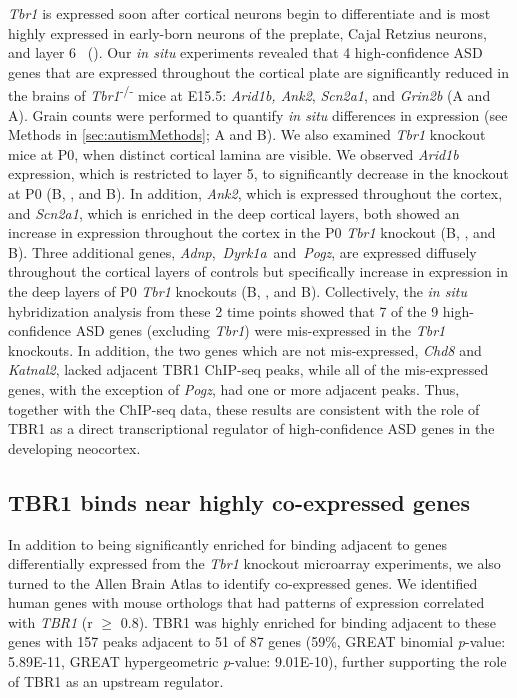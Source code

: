\emph{Tbr1} is expressed soon after cortical neurons begin to
differentiate and is most highly expressed in early-born neurons of the
preplate, Cajal Retzius neurons, and layer 6~\citep{Bulfone:1995kl} (). Our \emph{in situ} experiments revealed that 4 high-confidence ASD
genes that are expressed throughout the cortical plate are significantly
reduced in the brains of \emph{Tbr1}\textsuperscript{-/-} mice at E15.5:
\emph{Arid1b, Ank2}, \emph{Scn2a1}, and \emph{Grin2b} (A and
A). Grain counts were performed to quantify \emph{in
situ} differences in expression (see Methods in \ref{sec:autismMethods}; A and B). We also
examined \emph{Tbr1} knockout mice at P0, when distinct cortical lamina
are visible. We observed \emph{Arid1b} expression, which is restricted
to layer 5, to significantly decrease in the knockout at P0 (B,
, and B). In addition, \emph{Ank2}, which is
expressed throughout the cortex, and \emph{Scn2a1}, which is enriched in
the deep cortical layers, both showed an increase in expression
throughout the cortex in the P0 \emph{Tbr1} knockout (B,
, and B). Three additional genes,
\emph{Adnp},~\emph{Dyrk1a}~and~\emph{Pogz}, are expressed diffusely
throughout the cortical layers of controls but specifically increase in
expression in the deep layers of P0 \emph{Tbr1} knockouts (B, , and B). Collectively, the \emph{in situ}
hybridization analysis from these 2 time points showed that 7 of the 9
high-confidence ASD genes (excluding \emph{Tbr1}) were mis-expressed in
the \emph{Tbr1} knockouts. In addition, the two genes which are not
mis-expressed, \emph{Chd8} and \emph{Katnal2}, lacked adjacent TBR1
ChIP-seq peaks, while all of the mis-expressed genes, with the exception
of \emph{Pogz}, had one or more adjacent peaks. Thus, together with the
ChIP-seq data, these results are consistent with the role of TBR1 as a
direct transcriptional regulator of high-confidence ASD genes in the
developing neocortex.

\subsection{TBR1 binds near highly co-expressed genes}

In addition to being significantly enriched for binding adjacent to
genes differentially expressed from the \emph{Tbr1} knockout microarray
experiments, we also turned to the Allen Brain Atlas to identify
co-expressed genes. We identified human genes with mouse orthologs that
had patterns of expression correlated with \emph{TBR1} (r $\geq$ 0.8). TBR1
was highly enriched for binding adjacent to these genes with 157 peaks
adjacent to 51 of 87 genes (59\%, GREAT binomial \emph{p}-value:
5.89E-11, GREAT hypergeometric \emph{p}-value: 9.01E-10), further
supporting the role of TBR1 as an upstream regulator.


